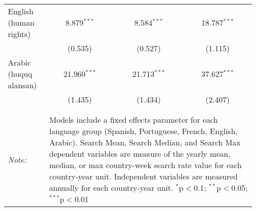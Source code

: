 \begin{table}[!htbp]
\begin{tabular}{@{\extracolsep{5pt}}lccc}
  English (human rights) & 8.879$^{***}$ & 8.584$^{***}$ & 18.787$^{***}$ \\ 
  & (0.535) & (0.527) & (1.115) \\ 
  Arabic (huquq alansan) & 21.960$^{***}$ & 21.713$^{***}$ & 37.627$^{***}$ \\ 
  & (1.435) & (1.434) & (2.407) \\ 
 \hline \\[-1.8ex] 
\hline 
\hline \\[-1.8ex] 
\textit{Note:}  & \multicolumn{3}{l}{\parbox[t]{8cm}{Models include a fixed effects parameter for each language group (Spanish, Portuguese, French, English, Arabic). Search Mean, Search Median, and Search Max dependent variables are measure of the yearly mean, median, or max country-week search rate value for each country-year unit. Independent variables are measured annually for each country-year unit. $^{*}$p$<$0.1; $^{**}$p$<$0.05; $^{***}$p$<$0.01}} \\ 
\end{tabular} 
\end{table} 
